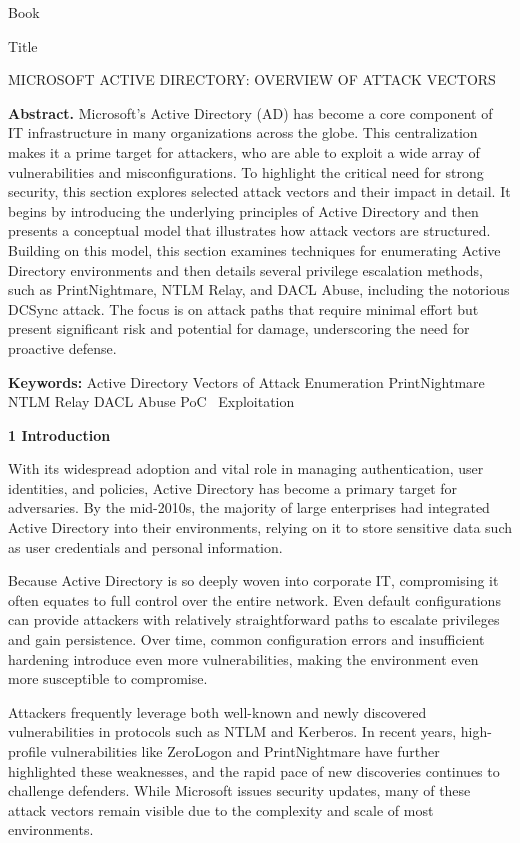 Book

Title

MICROSOFT ACTIVE DIRECTORY: OVERVIEW OF ATTACK VECTORS

\textbf{Abstract. }Microsoft’s Active Directory (AD) has become a core component of IT infrastructure in many organizations across the globe. This centralization makes it a prime target for attackers, who are able to exploit a wide array of vulnerabilities and misconfigurations. To highlight the critical need for strong security, this section explores selected attack vectors and their impact in detail. It begins by introducing the underlying principles of Active Directory and then presents a conceptual model that illustrates how attack vectors are structured. Building on this model, this section examines techniques for enumerating Active Directory environments and then details several privilege escalation methods, such as PrintNightmare, NTLM Relay, and DACL Abuse, including the notorious DCSync attack. The focus is on attack paths that require minimal effort but present significant risk and potential for damage, underscoring the need for proactive defense.

\textbf{Keywords: }Active Directory Vectors of Attack Enumeration PrintNightmare NTLM Relay DACL Abuse PoC  Exploitation

\textbf{1 Introduction}

With its widespread adoption and vital role in managing authentication, user identities, and policies, Active Directory has become a primary target for adversaries. By the mid-2010s, the majority of large enterprises had integrated Active Directory into their environments, relying on it to store sensitive data such as user credentials and personal information.

Because Active Directory is so deeply woven into corporate IT, compromising it often equates to full control over the entire network. Even default configurations can provide attackers with relatively straightforward paths to escalate privileges and gain persistence. Over time, common configuration errors and insufficient hardening introduce even more vulnerabilities, making the environment even more susceptible to compromise.

Attackers frequently leverage both well-known and newly discovered vulnerabilities in protocols such as NTLM and Kerberos. In recent years, high-profile vulnerabilities like ZeroLogon and PrintNightmare have further highlighted these weaknesses, and the rapid pace of new discoveries continues to challenge defenders. While Microsoft issues security updates, many of these attack vectors remain visible due to the complexity and scale of most environments.

